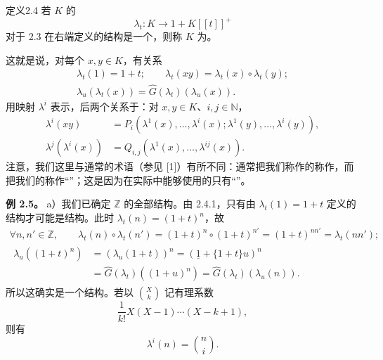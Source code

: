 \begin{SGAresult}{定义}{2.4}
若 $K$ 的
\[
\lambda_t:K\longrightarrow1+K[[t]]^+
\]
对于 2.3 在右端定义的结构是一个，则称 $K$ 为。
\end{SGAresult}
这就是说，对每个 $x,y\in K$，有关系
\[
\begin{gathered}
\lambda_t(1)=1+t;\qquad
\lambda_t(xy)=\lambda_t(x)\circ\lambda_t(y);\\
\lambda_u(\lambda_t(x))=\widehat G(\lambda_t)(\lambda_u(x)).
\end{gathered}
\tag{2.4.1}
\]
用映射 $\lambda^i$ 表示，后两个关系于：对 $x,y\in K$、$i,j\in\mathbb N$，
\[
\begin{aligned}
\lambda^i(xy)&=P_i(\lambda^1(x),\ldots,\lambda^i(x);
\lambda^1(y),\ldots,\lambda^i(y)),\\
\lambda^j(\lambda^i(x))&=Q_{i,j}(\lambda^1(x),\ldots,\lambda^{ij}(x)).
\end{aligned}
\tag{2.4.2}
\]
注意，我们这里与通常的术语（参见 [1]）有所不同：通常把我们称作的称作，而把我们的称作“”；这是因为在实际中能够使用的只有“”。

\textbf{例 2.5。} a）我们已确定 $\mathbb Z$ 的全部结构。由 2.4.1，只有由 $\lambda_t(1)=1+t$ 定义的结构才可能是结构。此时 $\lambda_t(n)=(1+t)^n$，故
\[
\begin{gathered}
\forall n,n'\in\mathbb Z,\qquad
\lambda_t(n)\circ\lambda_t(n')=(1+t)^n\circ(1+t)^{n'}
=(1+t)^{nn'}=\lambda_t(nn');\\
\begin{aligned}
\lambda_u((1+t)^n)&=(\lambda_u(1+t))^n
=(\underline1+\{1+t\}u)^n\\
&=\widehat G(\lambda_t)((1+u)^n)
=\widehat G(\lambda_t)(\lambda_u(n)).
\end{aligned}
\end{gathered}
\]
所以这确实是一个结构。若以 $\binom Xk$ 记有理系数
\[
\frac1{k!}X(X-1)\cdots(X-k+1),
\]
则有
\[
\lambda^i(n)=\binom ni.
\tag{2.5.1}
\]

